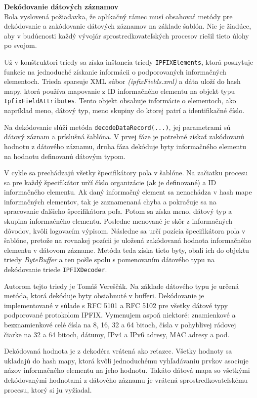 \textbf{Dekódovanie dátových záznamov} \\
Bola vyslovená požiadavka, že aplikačný rámec musí obsahovať metódy pre dekódovanie a zakódovanie 
dátových záznamov na základe šablón. Nie je žiadúce, aby v budúcnosti každý vývojár sprostredkovateľských 
procesov riešil tieto úlohy po svojom. 

Už v konštruktori triedy sa získa inštancia triedy \verb|IPFIXElements|, ktorá poskytuje 
funkcie na jednoduché získanie informácii o podporovaných informačných elementoch. Trieda sparsuje XML 
súbor \emph{(ipfixFields.xml)} a dáta uloží do hash mapy, ktorá používa mapovanie z ID informačného 
elementu na objekt typu \verb|IpfixFieldAttributes|. Tento objekt obsahuje informácie o elementoch, ako 
napríklad meno, dátový typ, meno skupiny do ktorej patrí a identifikačné číslo.\citep{veri}

Na dekódovanie slúži metóda \verb|decodeDataRecord(...)|, jej parametrami sú dátový záznam a príslušná
šablóna. V prvej fáze je potrebné získať zakódovanú hodnotu z dátového záznamu, druha fáza dekóduje 
byty informačného elementu na hodnotu definovanú dátovým typom.

V cykle sa prechádzajú všetky špecifikátory poľa v šablóne. Na začiatku procesu sa pre každý 
špecifikátor určí číslo organizácie (ak je definované) a ID informačného elementu. Ak daný informačný
element sa nenachádza v hash mape informačných elementov, tak je zaznamenaná chyba a pokračuje sa 
na spracovanie ďalšieho špecifikátora poľa. Potom sa získa meno, dátový typ a skupina informačného elementu. 
Posledne menované je skôr z informačných dôvodov, kvôli logovacím výpisom. Následne sa určí pozícia 
špecifikátora poľa v šablóne, pretože na rovnakej pozícii je uložená zakódovaná hodnota informačného
elementu v dátovom zázname. Metóda teda získa tieto byty, obalí ich do objektu triedy \emph{ByteBuffer}  
a ten pošle spolu s pomenovaním dátového typu na dekódovanie triede \verb|IPFIXDecoder|.

Autorom tejto triedy je Tomáš Vereščák. Na základe dátového typu je určená metóda, ktorá dekóduje 
byty obsiahnuté v bufferi. Dekódovanie je implementované v súlade s RFC 5101 \citep{rfc5101} a 
RFC 5102 \citep{rfc5102} pre všetky dátové typy podporované protokolom IPFIX. Vymenujem aspoň niektoré:
znamienkové a bezznamienkové celé čísla na 8, 16, 32 a 64 bitoch, čísla v pohyblivej rádovej čiarke na 
32 a 64 bitoch, dátumy, IPv4 a IPv6 adresy, MAC adresy a pod. 

Dekódovaná hodnota je z dekodéra vrátená ako reťazec. Všetky hodnoty sa ukladajú do hash mapy, ktorá 
kvôli jednoduchému vyhľadávaniu prvkov asociuje názov informačného elementu na jeho hodnotu. 
Takáto dátová mapa so všetkými dekódovanými hodnotami z dátového záznamu je vrátená sprostredkovateľskému 
procesu, ktorý si ju vyžiadal.


